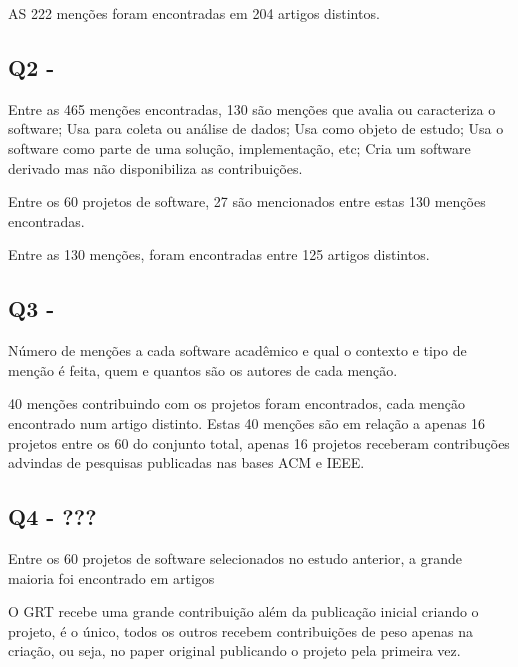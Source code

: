 
AS 222 menções foram encontradas em 204 artigos distintos.

\subsection{Q2 - \EstudoDoisQuestaoDois}

Entre as 465 menções encontradas, 130 são menções que avalia ou caracteriza o
software; Usa para coleta ou análise de dados; Usa como objeto de estudo; Usa o
software como parte de uma solução, implementação, etc; Cria um software
derivado mas não disponibiliza as contribuições.

Entre os 60 projetos de software, 27 são mencionados entre estas 130 menções
encontradas.


Entre as 130 menções, foram encontradas entre 125 artigos distintos.

\subsection{Q3 - \EstudoDoisQuestaoTres}

Número de menções a cada software acadêmico e qual o contexto e tipo de menção
é feita, quem e quantos são os autores de cada menção.


40 menções contribuindo com os projetos foram encontrados, cada menção
encontrado num artigo distinto. Estas 40 menções são em relação a apenas
16 projetos entre os 60 do conjunto total, apenas 16 projetos receberam
contribuções advindas de pesquisas publicadas nas bases ACM e IEEE.

\subsection{Q4 - ???}

Entre os 60 projetos de software selecionados no estudo anterior, a grande maioria
foi encontrado em artigos 

O GRT recebe uma grande contribuição além da publicação inicial criando o projeto,
é o único, todos os outros recebem contribuições de peso apenas na criação, ou seja,
no paper original publicando o projeto pela primeira vez.

